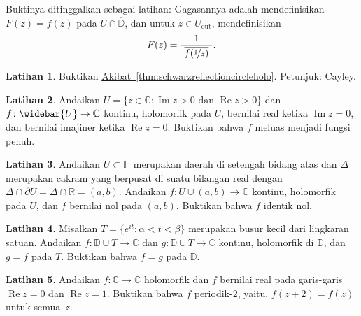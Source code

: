 \documentclass[12pt,openany]{book}
\renewcommand{\Re}{\operatorname{Re}}
\renewcommand{\Im}{\operatorname{Im}}
\newcommand{\C}{{\mathbb{C}}}
\newcommand{\R}{{\mathbb{R}}}
\newcommand{\D}{{\mathbb{D}}}
\newcommand{\bH}{{\mathbb{H}}}
\theoremstyle{plain}
\theoremstyle{remark}
\theoremstyle{definition}
\newenvironment{exbox}{%
    \def\FrameCommand{\vrule width 1pt \relax\hspace{10pt}}%
    \MakeFramed{\advance\hsize-\width\FrameRestore}%
}{%
    \endMakeFramed
}
\theoremstyle{exercise}
\newtheorem{exercise}{Latihan}[section]
\theoremstyle{example}
\newcommand{\corref}[1]{\hyperref[#1]{Akibat~\ref*{#1}}}
\begin{document}
Buktinya ditinggalkan sebagai latihan: Gagasannya adalah mendefinisikan
$F(z) = f(z)$ pada $U \cap \overline{\D}$, dan untuk $z \in U_{\text{out}}$, mendefinisikan
\begin{equation*}
F(z) = \frac{1}{~\overline{f(\nicefrac{1}{\bar{z}})}~} .
\end{equation*}

\begin{exbox}
\begin{exercise}
Buktikan \corref{thm:schwarzreflectioncircleholo}.  Petunjuk: Cayley.
\end{exercise}

\begin{exercise}
Andaikan $U = \{ z \in \C : \Im z > 0 \text{ dan } \Re z > 0 \}$
dan $f \colon \widebar{U} \to \C$ kontinu, holomorfik 
pada $U$, bernilai real ketika $\Im z =0$, dan bernilai imajiner
ketika $\Re z = 0$.  Buktikan bahwa $f$ meluas menjadi fungsi penuh.
\end{exercise}

\begin{exercise}
Andaikan $U \subset \bH$ merupakan daerah di setengah bidang atas
dan $\Delta$ merupakan cakram yang berpusat di suatu bilangan real
dengan $\Delta \cap \partial U = \Delta \cap \R = (a,b)$.
Andaikan $f \colon U \cup (a,b) \to \C$ kontinu, holomorfik pada $U$,
dan $f$ bernilai nol pada $(a,b)$.  Buktikan bahwa $f$ identik nol.
\end{exercise}

\begin{exercise}
Misalkan $T = \{ e^{it} : \alpha < t < \beta \}$ merupakan busur kecil dari lingkaran
satuan.  Andaikan $f \colon \D \cup T \to \C$ dan $g \colon \D \cup T \to \C$
kontinu, holomorfik di $\D$, dan $g = f$ pada $T$.  Buktikan bahwa
$f=g$ pada $\D$.
\end{exercise}

\begin{exercise}
Andaikan $f \colon \C \to \C$ holomorfik dan $f$ bernilai real
pada garis-garis $\Re z = 0$ dan $\Re z = 1$.  Buktikan bahwa $f$
periodik-$2$, yaitu, $f(z+2) = f(z)$ untuk semua~$z$.
\end{exercise}


\end{exbox}
\end{document}
